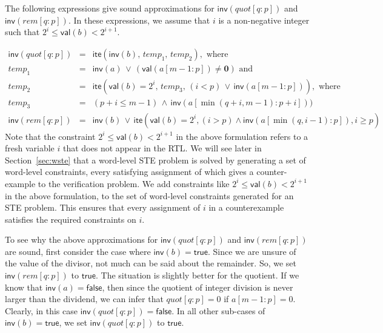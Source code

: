 \documentclass{llncs}
\newcommand{\val}{\ensuremath{\mathsf{val}}}
\newcommand{\inv}{\ensuremath{\mathsf{inv}}}
\newcommand{\ite}{\ensuremath{\mathsf{ite}}}
\newcommand{\true}{\ensuremath{\mathsf{true}}}
\newcommand{\false}{\ensuremath{\mathsf{false}}}
\begin{document}
The following expressions give sound approximations for
${\inv}(quot[q:p])$ and ${\inv}(rem[q:p])$.  In these expressions, we
assume that $i$ is a non-negative integer such that $2^i \le {\val}(b)
< 2^{i+1}$.  

\begin{eqnarray}
{\inv}(quot[q:p]) & = & {\ite}({\inv}(b), \,temp_1, \, temp_2), \text{ where } \nonumber\\
temp_1            & = & {\inv}(a) \,\vee\, ({\val}(a[m-1:p]) \neq \mathbf{0}) \text{ and }\nonumber \\
temp_2            & = & {\ite}({\val}(b) = 2^i, \,temp_3, \,(i < p) \,\vee\, {\inv}(a[m-1:p])), \text{ where } \nonumber \\
temp_3            & = & (p+i \le m-1) \,\wedge\, {\inv}(a[\min(q+i,m-1):p+i])) \nonumber\\{\inv}(rem[q:p])\! & = & \!{\inv}(b) \,\vee\, {\ite}({\val}(b) = 2^i, (i > p) \wedge {\inv}(a[\min(q, i-1):p]), i \ge p) \nonumber \end{eqnarray}
Note that the constraint $2^i \le {\val}(b) < 2^{i+1}$ in the
above formulation refers to a fresh variable $i$ that does not
appear in the RTL.  
We will see later in Section~\ref{sec:wste} that a word-level STE
problem is solved by generating a set of word-level constraints, every
satisfying assignment of which gives a counter-example to the
verification problem.  We add constraints like $2^i \le {\val}(b) <
2^{i+1}$ in the above formulation, to the set of word-level
constraints generated for an STE problem.  This ensures that every
assignment of $i$ in a counterexample satisfies the required
constraints on $i$.



To see why the above approximations for ${\inv}(quot[q:p])$ and
${\inv}(rem[q:p])$ are sound, first consider the case where
${\inv}(b) = \true$.  Since we are unsure of the value of the divisor,
not much can be said about the remainder.  So, we set
${\inv}(rem[q:p])$ to $\true$.  The situation is slightly better for
the quotient.  If we know that ${\inv}(a) = \false$, then since the
quotient of integer division is never larger than the dividend, we can
infer that $quot[q:p] = 0$ if $a[m-1:p] = 0$.  Clearly, in this case
${\inv}(quot[q:p]) = \false$.  In all other sub-cases of ${\inv}(b) =
\true$, we set ${\inv}(quot[q:p])$ to $\true$.
\end{document}
